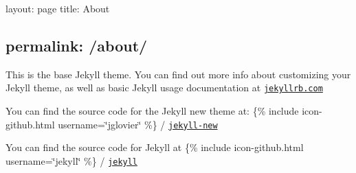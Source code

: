 

 layout\+: page title\+: About \subsection*{permalink\+: /about/ }

This is the base Jekyll theme. You can find out more info about customizing your Jekyll theme, as well as basic Jekyll usage documentation at \href{http://jekyllrb.com/}{\tt jekyllrb.\+com}

You can find the source code for the Jekyll new theme at\+: \{\% include icon-\/github.\+html username=\char`\"{}jglovier\char`\"{} \%\} / \href{https://github.com/jglovier/jekyll-new}{\tt jekyll-\/new}

You can find the source code for Jekyll at \{\% include icon-\/github.\+html username=\char`\"{}jekyll\char`\"{} \%\} / \href{https://github.com/jekyll/jekyll}{\tt jekyll} 